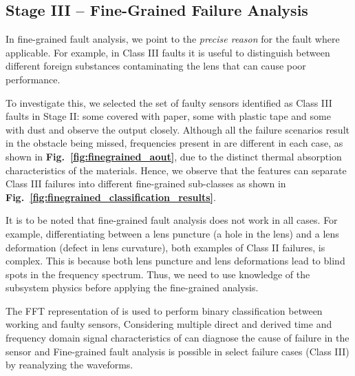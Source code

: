 \subsection{Stage III -- Fine-Grained Failure Analysis} In fine-grained fault analysis, we point to the \textit{precise reason} for the fault where applicable. For example, in Class III faults it is useful to distinguish between different foreign substances contaminating the lens that can cause poor performance.


To investigate this, we selected the set of faulty sensors identified as Class III faults in 
Stage II: some covered with paper, some with plastic tape and some with dust and observe the \aout output closely. 
%
%
Although all the failure scenarios result in the obstacle being missed, frequencies present in \aout are different in each case, as shown in {\bfseries Fig.~\ref{fig:finegrained_aout}}, %
%
due to the distinct thermal absorption characteristics of the materials.
%
Hence, we observe that the \aout features can separate Class III failures into different fine-grained sub-classes as shown in {\bfseries Fig.~\ref{fig:finegrained_classification_results}}. 

It is to be noted that fine-grained fault analysis does not work in all cases.
%
For example, differentiating between a lens puncture (a hole in the lens) and a lens deformation (defect in lens curvature), both examples of Class II failures, is complex. 
%
This is because both lens puncture and lens deformations lead to blind spots in the frequency spectrum. 
%
Thus, we need to use knowledge of the subsystem physics before applying the fine-grained analysis.

 \ci The FFT representation of \aout is used to perform binary classification between working and faulty sensors, \cii Considering multiple direct and derived time and frequency domain signal characteristics of \aout can diagnose the cause of failure in the sensor and \ciii Fine-grained fault analysis is possible in select failure cases (\eg Class III) by reanalyzing the \aout waveforms. 

